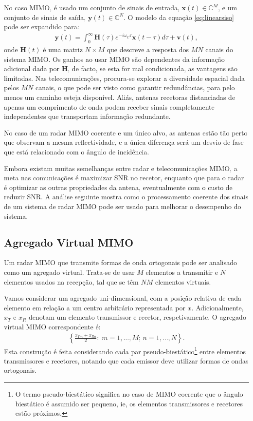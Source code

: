 \documentclass[purist,portuguese]{ist-report}
\begin{document}
No caso MIMO, é usado um conjunto de sinais de entrada, $\mathbf{x}(t)\in\mathbb{C}^M$, e um conjunto de sinais de saída, $\mathbf{y}(t)\in\mathbb{C}^N$.
O modelo da equação \ref{eq:linearsiso} pode ser expandido para:
\begin{align}
  \mathbf{y}(t) = \int_0^\infty \mathbf{H}(\tau)e^{-i\omega_C \tau}\mathbf{x}(t-\tau)d\tau + \mathbf{v}(t),
  \label{eq:linearmimo}
\end{align}
onde $\mathbf{H}(t)$ é uma matriz $N\times M$ que descreve a resposta dos $MN$ canais do sistema MIMO.
Os ganhos ao usar MIMO são dependentes da informação adicional dada por $\mathbf{H}$, de facto, se esta for mal condicionada, as vantagens são limitadas. 
Nas telecomunicações, procura-se explorar a diversidade espacial dada pelos $MN$ canais, o que pode ser visto como garantir redundâncias, para pelo menos um caminho esteja disponível.
Aliás, antenas recetoras distanciadas de apenas um comprimento de onda podem receber sinais completamente independentes que transportam informação redundante.

No caso de um radar MIMO coerente e um único alvo, as antenas estão tão perto que observam a mesma reflectividade, e a única diferença será um desvio de fase que está relacionado com o ângulo de incidência.

Embora existam muitas semelhanças entre radar e telecomunicações MIMO, a meta nas comunicações é maximizar SNR no recetor, enquanto que para o radar é optimizar as outras propriedades da antena, eventualmente com o custo de reduzir SNR.
A análise seguinte mostra como o processamento coerente dos sinais de um sistema de radar MIMO pode ser usado para melhorar o desempenho do sistema.

\subsection{Agregado Virtual MIMO}

Um radar MIMO que transmite formas de onda ortogonais pode ser analisado como um agregado virtual.
Trata-se de usar $M$ elementos a transmitir e $N$ elementos usados na recepção, tal que se têm $NM$ elementos virtuais.

Vamos considerar um agregado uni-dimensional, com a posição relativa de cada elemento em relação a um centro arbitrário representada por $x$. 
Adicionalmente, $x_T$ e $x_R$ denotam um elemento transmissor e recetor, respetivamente.
O agregado virtual MIMO correspondente é:
\begin{align}
  \left\{ \frac{x_{Tm}+x_{Rn}}{2}:\; m=1,\ldots,M;\,n=1,\ldots,N \right\}.
  \label{eq:virtualmimo}
\end{align}
Esta construção é feita considerando cada par pseudo-biestático\footnote{O termo pseudo-biestático significa no caso de MIMO coerente que o ângulo biestático é assumido ser pequeno, ie, os elementos transmissores e recetores estão próximos.} entre elementos transmissores e recetores, notando que cada emissor deve utilizar formas de ondas ortogonais.
\end{document}
